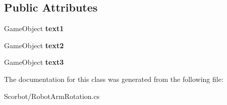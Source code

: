 \subsection*{Public Attributes}
\begin{DoxyCompactItemize}
\item 
\mbox{\label{class_robot_arm_rotation_aeffab1927cb3d66c84b0b8b375c1a478}} 
Game\+Object {\bfseries text1}
\item 
\mbox{\label{class_robot_arm_rotation_a9fa2f78b8f52350b285e43cdffebf5ca}} 
Game\+Object {\bfseries text2}
\item 
\mbox{\label{class_robot_arm_rotation_a721c21c4b30b4cc1daddf082030e62cc}} 
Game\+Object {\bfseries text3}
\end{DoxyCompactItemize}


The documentation for this class was generated from the following file\+:\begin{DoxyCompactItemize}
\item 
Scorbot/Robot\+Arm\+Rotation.\+cs\end{DoxyCompactItemize}
